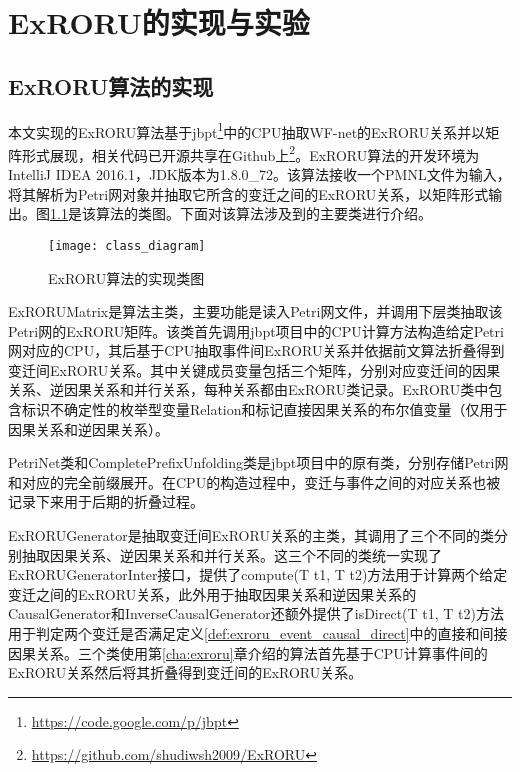 
\chapter{ExRORU的实现与实验}\label{cha:experiment}

\section{ExRORU算法的实现}\label{sec:implementation}
本文实现的ExRORU算法基于jbpt\footnote{\url{https://code.google.com/p/jbpt}}\cite{polyvyanyy2013towards}中的CPU抽取WF-net的ExRORU关系并以矩阵形式展现，相关代码已开源共享在Github上\footnote{\url{https://github.com/shudiwsh2009/ExRORU}}。ExRORU算法的开发环境为IntelliJ IDEA 2016.1，JDK版本为1.8.0\_72。该算法接收一个PMNL文件为输入，将其解析为Petri网对象并抽取它所含的变迁之间的ExRORU关系，以矩阵形式输出。图\ref{fig:class_diagram}是该算法的类图。下面对该算法涉及到的主要类进行介绍。

\begin{figure}[htbp]
  \centering
  \texttt{[image: class\_diagram]}
  \caption{ExRORU算法的实现类图}
  \label{fig:class_diagram}
\end{figure}

ExRORUMatrix是算法主类，主要功能是读入Petri网文件，并调用下层类抽取该Petri网的ExRORU矩阵。该类首先调用jbpt项目中的CPU计算方法构造给定Petri网对应的CPU，其后基于CPU抽取事件间ExRORU关系并依据前文算法折叠得到变迁间ExRORU关系。其中关键成员变量包括三个矩阵，分别对应变迁间的因果关系、逆因果关系和并行关系，每种关系都由ExRORU类记录。ExRORU类中包含标识不确定性的枚举型变量Relation和标记直接因果关系的布尔值变量（仅用于因果关系和逆因果关系）。

PetriNet类和CompletePrefixUnfolding类是jbpt项目中的原有类，分别存储Petri网和对应的完全前缀展开。在CPU的构造过程中，变迁与事件之间的对应关系也被记录下来用于后期的折叠过程。

ExRORUGenerator是抽取变迁间ExRORU关系的主类，其调用了三个不同的类分别抽取因果关系、逆因果关系和并行关系。这三个不同的类统一实现了ExRORUGeneratorInter接口，提供了compute(T t1, T t2)方法用于计算两个给定变迁之间的ExRORU关系，此外用于抽取因果关系和逆因果关系的CausalGenerator和InverseCausalGenerator还额外提供了isDirect(T t1, T t2)方法用于判定两个变迁是否满足定义\ref{def:exroru_event_causal_direct}中的直接和间接因果关系。三个类使用第\ref{cha:exroru}章介绍的算法首先基于CPU计算事件间的ExRORU关系然后将其折叠得到变迁间的ExRORU关系。

